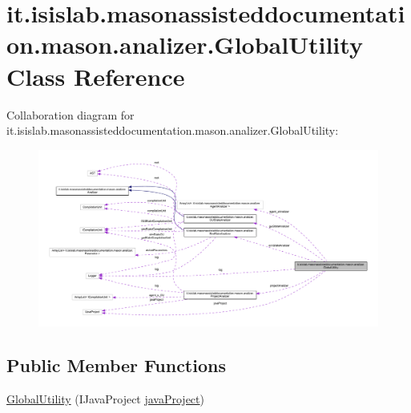 \hypertarget{classit_1_1isislab_1_1masonassisteddocumentation_1_1mason_1_1analizer_1_1_global_utility}{\section{it.\-isislab.\-masonassisteddocumentation.\-mason.\-analizer.\-Global\-Utility Class Reference}
\label{classit_1_1isislab_1_1masonassisteddocumentation_1_1mason_1_1analizer_1_1_global_utility}
}


Collaboration diagram for it.\-isislab.\-masonassisteddocumentation.\-mason.\-analizer.\-Global\-Utility\-:\nopagebreak
\begin{figure}[H]
\begin{center}
\leavevmode
\includegraphics[width=350pt]{classit_1_1isislab_1_1masonassisteddocumentation_1_1mason_1_1analizer_1_1_global_utility__coll__graph}
\end{center}
\end{figure}
\subsection*{Public Member Functions}
\begin{DoxyCompactItemize}
\item 
\hyperlink{classit_1_1isislab_1_1masonassisteddocumentation_1_1mason_1_1analizer_1_1_global_utility_abcfe6c4f11c8b1bac63a16758117449c}{Global\-Utility} (I\-Java\-Project \hyperlink{classit_1_1isislab_1_1masonassisteddocumentation_1_1mason_1_1analizer_1_1_global_utility_aba72c531253eef1bc593a95ab7935605}{java\-Project})
\end{DoxyCompactItemize}

